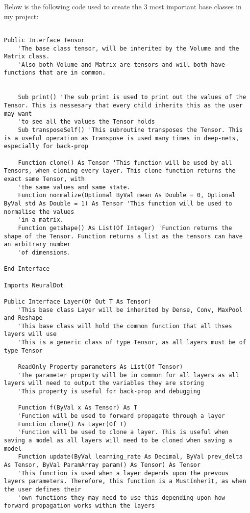 Below is the following code used to create the 3 most important base classes in my project:

\begin{verbatim}

Public Interface Tensor
    'The base class tensor, will be inherited by the Volume and the Matrix class.
    'Also both Volume and Matrix are tensors and will both have functions that are in common.


    Sub print() 'The sub print is used to print out the values of the Tensor. This is nessesary that every child inherits this as the user may want
    'to see all the values the Tensor holds
    Sub transposeSelf() 'This subroutine transposes the Tensor. This is a useful operation as Transpose is used many times in deep-nets, especially for back-prop

    Function clone() As Tensor 'This function will be used by all Tensors, when cloning every layer. This clone function returns the exact same Tensor, with
    'the same values and same state.
    Function normalize(Optional ByVal mean As Double = 0, Optional ByVal std As Double = 1) As Tensor 'This function will be used to normalise the values
    'in a matrix.
    Function getshape() As List(Of Integer) 'Function returns the shape of the Tensor. Function returns a list as the tensors can have an arbitrary number
    'of dimensions.

End Interface

Imports NeuralDot

Public Interface Layer(Of Out T As Tensor)
    'This base class Layer will be inherited by Dense, Conv, MaxPool and Reshape
    'This base class will hold the common function that all thses layers will use
    'This is a generic class of type Tensor, as all layers must be of type Tensor

    ReadOnly Property parameters As List(Of Tensor)
    'The parameter property will be in common for all layers as all layers will need to output the variables they are storing
    'This property is useful for back-prop and debugging

    Function f(ByVal x As Tensor) As T
    'Function will be used to forward propagate through a layer
    Function clone() As Layer(Of T)
    'Function will be used to clone a layer. This is useful when saving a model as all layers will need to be cloned when saving a model
    Function update(ByVal learning_rate As Decimal, ByVal prev_delta As Tensor, ByVal ParamArray param() As Tensor) As Tensor
    'This function is used when a layer depends upon the prevous layers parameters. Therefore, this function is a MustInherit, as when the user defines their
    'own functions they may need to use this depending upon how forward propagation works within the layers


\end{verbatim}
